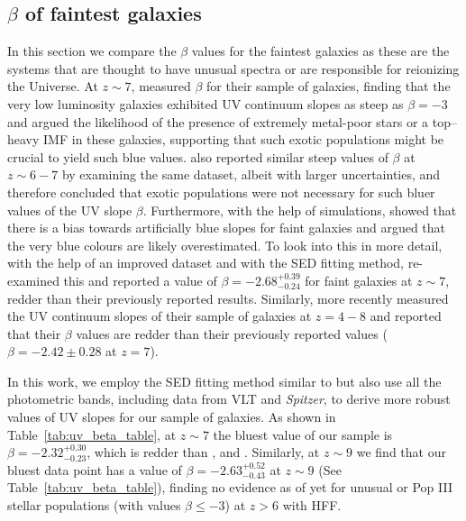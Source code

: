 \documentclass[twocolumn]{aastex63}
\begin{document}
\subsection{$\beta$ of faintest galaxies}
In this section we compare the $\beta$ values for the faintest galaxies as these are the systems that are thought to have unusual spectra or are responsible for reionizing the Universe. At $z\sim7$, \citet{Bouwens2010} measured $\beta$ for their sample of galaxies, finding that the very low luminosity galaxies exhibited UV continuum slopes as steep as $\beta=-3$ and argued the likelihood of the presence of extremely metal-poor stars or a top--heavy IMF in these galaxies, supporting that such exotic populations might be crucial to yield such blue values. \citet{Finkelstein2010} also reported similar steep values of $\beta$ at $z\sim6-7$ by examining the same dataset, albeit with larger uncertainties, and therefore concluded that exotic populations were not necessary for such bluer values of the UV slope $\beta$. Furthermore, with the help of simulations, \citet{Dunlop2012} showed that there is a bias towards artificially blue slopes for faint galaxies and argued that the very blue colours are likely overestimated. To look into this in more detail, with the help of an improved dataset and with the SED fitting method, \citet{Finkelstein2012} re-examined this and reported a value of $\beta=-2.68_{-0.24}^{+0.39}$ for faint galaxies at $z\sim7$, redder than their previously reported results. Similarly, more recently \citet{Bouwens2014b} measured the UV continuum slopes of their sample of galaxies at $z=4-8$ and reported that their $\beta$ values are redder than their previously reported values ($\beta=-2.42\pm0.28$ at $z=7$).

In this work, we employ the SED fitting method similar to \citet{Finkelstein2012} but also use all the photometric bands, including data from VLT and \textit{Spitzer}, to derive more robust values of UV slopes for our sample of galaxies. As shown in Table~\ref{tab:uv_beta_table}, at $z\sim7$ the bluest value of our sample is $\beta=-2.32_{-0.23}^{+0.30}$, which is redder than \citet{Finkelstein2012}, \citet{Bouwens2010} and \citet{Bouwens2014}. Similarly, at $z\sim9$ we find that our bluest data point has a value of $\beta=-2.63_{-0.43}^{+0.52}$ at $z\sim9$ (See Table~\ref{tab:uv_beta_table}), finding no evidence as of yet for unusual or Pop III stellar populations (with values $\beta\leq-3$) at $z>6$ with HFF.
\end{document}
